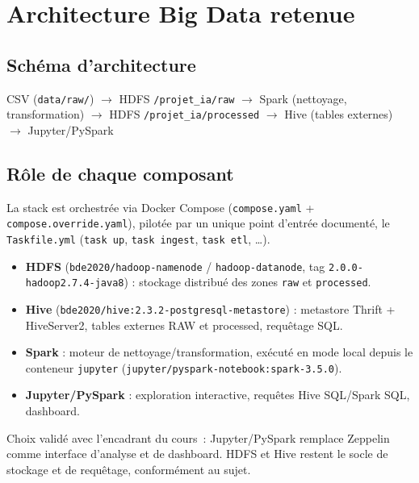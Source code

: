 \chapter{Architecture Big Data retenue}

\section{Schéma d'architecture}

\begin{center}
\small
CSV (\texttt{data/raw/}) $\to$ HDFS \texttt{/projet\_ia/raw}
$\to$ Spark (nettoyage, transformation)
$\to$ HDFS \texttt{/projet\_ia/processed}
$\to$ Hive (tables externes)
$\to$ Jupyter/PySpark
\end{center}

\section{Rôle de chaque composant}

La stack est orchestrée via Docker Compose (\texttt{compose.yaml} +
\texttt{compose.override.yaml}), pilotée par un unique point d'entrée
documenté, le \texttt{Taskfile.yml} (\texttt{task up}, \texttt{task
ingest}, \texttt{task etl}, \dots).

\begin{itemize}[leftmargin=1.5em]
  \item \textbf{HDFS} (\texttt{bde2020/hadoop-namenode} /
    \texttt{hadoop-datanode}, tag \texttt{2.0.0-hadoop2.7.4-java8}) :
    stockage distribué des zones \texttt{raw} et \texttt{processed}.
  \item \textbf{Hive} (\texttt{bde2020/hive:2.3.2-postgresql-metastore})
    : metastore Thrift + HiveServer2, tables externes RAW et
    processed, requêtage SQL.
  \item \textbf{Spark} : moteur de nettoyage/transformation, exécuté en
    mode local depuis le conteneur \texttt{jupyter}
    (\texttt{jupyter/pyspark-notebook:spark-3.5.0}).
  \item \textbf{Jupyter/PySpark} : exploration interactive, requêtes
    Hive SQL/Spark SQL, dashboard.
\end{itemize}

\begin{constat}
Choix validé avec l'encadrant du cours~: Jupyter/PySpark remplace Zeppelin comme
interface d'analyse et de dashboard. HDFS et Hive restent le socle de
stockage et de requêtage, conformément au sujet.
\end{constat}

